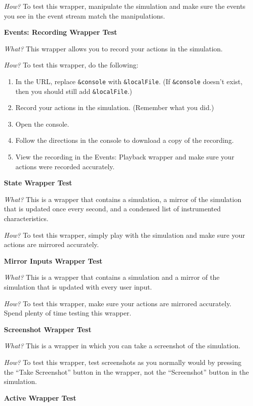 \documentclass[titlepage]{article}
\begin{document}
\textit{How?} To test this wrapper, manipulate the simulation and make sure the events you see in the event stream match the manipulations.

\textbf{Events: Recording Wrapper Test}

\textit{What?} This wrapper allows you to record your actions in the simulation.

\textit{How?} To test this wrapper, do the following:

		\begin{enumerate}
			\item In the URL, replace \verb|&console| with \verb|&localFile|. (If \verb|&console| doesn't exist, then you should still add \verb|&localFile|.)
			\item Record your actions in the simulation. (Remember what you did.)
			\item Open the console.
			\item Follow the directions in the console to download a copy of the recording.
			\item View the recording in the Events: Playback wrapper and make sure your actions were recorded accurately.
		\end{enumerate}

\textbf{State Wrapper Test}

\textit{What?} This is a wrapper that contains a simulation, a mirror of the simulation that is updated once every second, and a condensed list of instrumented characteristics.

\textit{How?} To test this wrapper, simply play with the simulation and make sure your actions are mirrored accurately.

\textbf{Mirror Inputs Wrapper Test}

\textit{What?} This is a wrapper that contains a simulation and a mirror of the simulation that is updated with every user input.

\textit{How?} To test this wrapper, make sure your actions are mirrored accurately. Spend plenty of time testing this wrapper.

\textbf{Screenshot Wrapper Test}

\textit{What?} This is a wrapper in which you can take a screenshot of the simulation.

\textit{How?} To test this wrapper, test screenshots as you normally would by pressing the ``Take Screenshot'' button in the wrapper, not the ``Screenshot'' button in the simulation.

\textbf{Active Wrapper Test}
\end{document}
